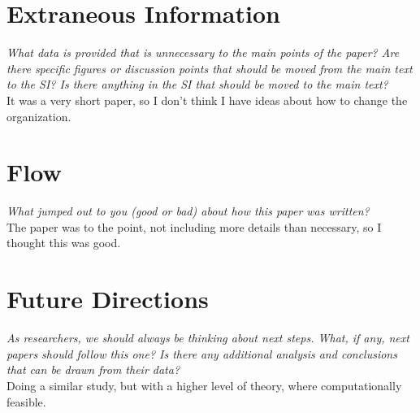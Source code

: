 \documentclass[12pt]{article}
\begin{document}
\section*{Extraneous Information}
\textit{What data is provided that is unnecessary to the main points of the paper? Are there specific figures or discussion points that should be moved from the main text to the SI? Is there anything in the SI that should be moved to the main text?}\\[4pt]
It was a very short paper, so I don't think I have ideas about how to change the organization.

\section*{Flow}
\textit{What jumped out to you (good or bad) about how this paper was written?}\\[4pt]
The paper was to the point, not including more details than necessary, so I thought this was good.

\section*{Future Directions}
\textit{As researchers, we should always be thinking about next steps. What, if any, next papers should follow this one? Is there any additional analysis and conclusions that can be drawn from their data?}\\[4pt]
Doing a similar study, but with a higher level of theory, where computationally feasible.
\end{document}
